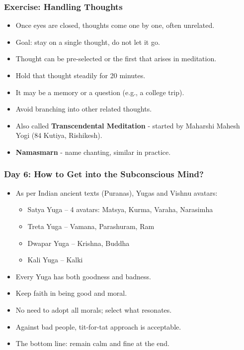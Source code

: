 \begin{frame}[fragile]\frametitle{Exercise: Handling Thoughts}
\begin{itemize}
  \item Once eyes are closed, thoughts come one by one, often unrelated.
  \item Goal: stay on a single thought, do not let it go.
  \item Thought can be pre-selected or the first that arises in meditation.
  \item Hold that thought steadily for 20 minutes.
  \item It may be a memory or a question (e.g., a college trip).
  \item Avoid branching into other related thoughts.
  \item Also called \textbf{Transcendental Meditation} - started by Maharshi Mahesh Yogi (84 Kutiya, Rishikesh).
  \item \textbf{Namasmarn} - name chanting, similar in practice.
\end{itemize}
\end{frame}

\begin{frame}[fragile]\frametitle{Day 6: How to Get into the Subconscious Mind?}
    \begin{itemize}
        \item As per Indian ancient texts (Puranas), Yugas and Vishnu avatars:
        \begin{itemize}
            \item Satya Yuga – 4 avatars: Matsya, Kurma, Varaha, Narasimha
            \item Treta Yuga – Vamana, Parashuram, Ram
            \item Dwapar Yuga – Krishna, Buddha
            \item Kali Yuga – Kalki
        \end{itemize}
        \item Every Yuga has both goodness and badness.
        \item Keep faith in being good and moral.
        \item No need to adopt all morals; select what resonates.
        \item Against bad people, tit-for-tat approach is acceptable.
        \item The bottom line: remain calm and fine at the end.
    \end{itemize}
\end{frame}

